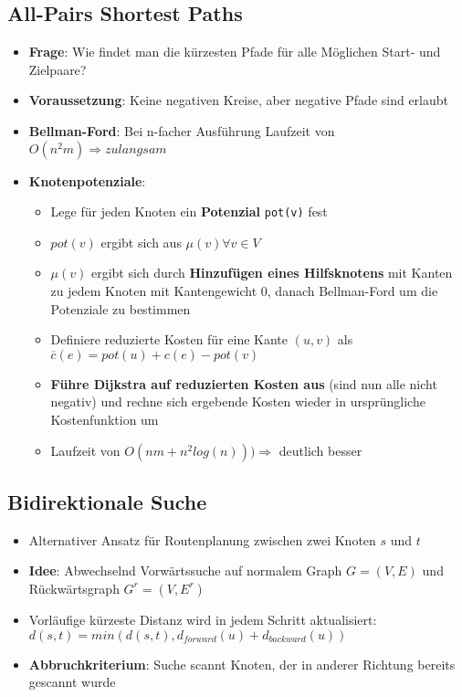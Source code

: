 \documentclass[10pt,a4paper]{article}
\begin{document}
	\subsection{All-Pairs Shortest Paths}
	\label{sp:sub:all_pairs_shortest_paths}

	\begin{itemize}
		\item \textbf{Frage}: Wie findet man die kürzesten Pfade für alle Möglichen Start- und Zielpaare?
		\item \textbf{Voraussetzung}: Keine negativen Kreise, aber negative Pfade sind erlaubt
		\item \textbf{Bellman-Ford}: Bei n-facher Ausführung Laufzeit von $O(n^2m) \Rightarrow zu langsam$
		\item \textbf{Knotenpotenziale}:
		\begin{itemize}
			\item Lege für jeden Knoten ein \textbf{Potenzial} \texttt{pot(v)} fest
			\item $pot(v)$ ergibt sich aus $\mu(v) \forall v \in V$
			\item $\mu(v)$ ergibt sich durch \textbf{Hinzufügen eines Hilfsknotens} mit Kanten zu jedem Knoten mit Kantengewicht $0$, danach Bellman-Ford um die Potenziale zu bestimmen
			\item Definiere reduzierte Kosten für eine Kante $(u,v)$ als $\overline{c}(e) = pot(u) + c(e) - pot(v)$
			\item \textbf{Führe Dijkstra auf reduzierten Kosten aus} (sind nun alle nicht negativ) und rechne sich ergebende Kosten wieder in ursprüngliche Kostenfunktion um
			\item Laufzeit von $O(nm + n^2log(n))) \Rightarrow$ deutlich besser
		\end{itemize}
	\end{itemize}

	\subsection{Bidirektionale Suche}
	\label{sp:sub:bidirektionale_suche}
	
	\begin{itemize}
		\item Alternativer Ansatz für Routenplanung zwischen zwei Knoten $s$ und $t$
		\item \textbf{Idee}: Abwechselnd Vorwärtssuche auf normalem Graph $G = (V,E)$ und Rückwärtsgraph $G^r = (V,E^r)$
		\item Vorläufige kürzeste Distanz wird in jedem Schritt aktualisiert:\\$d(s,t) = min(d(s,t), d_{forward}(u) + d_{backward}(u))$
		\item \textbf{Abbruchkriterium}: Suche scannt Knoten, der in anderer Richtung bereits gescannt wurde
	\end{itemize}
\end{document}
